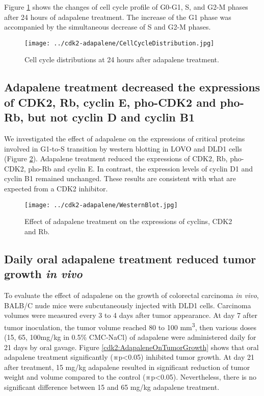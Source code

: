 Figure \ref{cdk2:CellCycleDistribution} shows the changes of cell cycle profile of G0-G1, S, and G2-M phases after 24 hours of adapalene treatment. The increase of the G1 phase was accompanied by the simultaneous decrease of S and G2-M phases.

\begin{figure}
\centering
\texttt{[image: ../cdk2-adapalene/CellCycleDistribution.jpg]}
\caption{Cell cycle distributions at 24 hours after adapalene treatment.}
\label{cdk2:CellCycleDistribution}
\end{figure}

\subsection{Adapalene treatment decreased the expressions of CDK2, Rb, cyclin E, pho-CDK2 and pho-Rb, but not cyclin D and cyclin B1}

We investigated the effect of adapalene on the expressions of critical proteins involved in G1-to-S transition by western blotting in LOVO and DLD1 cells (Figure \ref{cdk2:WesternBlot}). Adapalene treatment reduced the expressions of CDK2, Rb, pho-CDK2, pho-Rb and cyclin E. In contrast, the expression levels of cyclin D1 and cyclin B1 remained unchanged. These results are consistent with what are expected from a CDK2 inhibitor.

\begin{figure}
\centering
\texttt{[image: ../cdk2-adapalene/WesternBlot.jpg]}
\caption{Effect of adapalene treatment on the expressions of cyclins, CDK2 and Rb.}
\label{cdk2:WesternBlot}
\end{figure}

\subsection{Daily oral adapalene treatment reduced tumor growth \textit{in vivo}}

To evaluate the effect of adapalene on the growth of colorectal carcinoma \textit{in vivo}, BALB/C nude mice were subcutaneously injected with DLD1 cells. Carcinoma volumes were measured every 3 to 4 days after tumor appearance. At day 7 after tumor inoculation, the tumor volume reached 80 to 100 mm\textsuperscript{3}, then various doses (15, 65, 100mg/kg in 0.5\% CMC-NaCl) of adapalene were administered daily for 21 days by oral gavage. Figure \ref{cdk2:AdapaleneOnTumorGrowth} shows that oral adapalene treatment significantly (※p<0.05) inhibited tumor growth. At day 21 after treatment, 15 mg/kg adapalene resulted in significant reduction of tumor weight and volume compared to the control (※p<0.05). Nevertheless, there is no significant difference between 15 and 65 mg/kg adapalene treatment.

